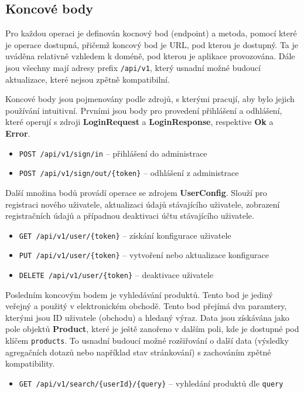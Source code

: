 \documentclass[FM,DP]{tulthesis}
\begin{document}
\subsection{Koncové body}

Pro každou operaci je definován kocnový bod (endpoint) a metoda, pomocí které je operace
dostupná, přičemž koncový bod je URL, pod kterou je dostupný. Ta je uváděna relativně
vzhledem k doméně, pod kterou je aplikace provozována. Dále jsou všechny mají adresy
prefix \verb|/api/v1|, který usnadní možné budoucí aktualizace, které nejsou zpětně kompatibilní.

Koncové body jsou pojmenovány podle zdrojů, s kterými pracují, aby bylo jejich používání 
intuitivní. Prvními jsou body pro provedení přihlášení a odhlášení, které operují
s zdroji \textbf{LoginRequest} a \textbf{LoginResponse}, respektive \textbf{Ok} a \textbf{Error}.

\begin{itemize}
\item \verb|POST /api/v1/sign/in| -- přihlášení do administrace
\item \verb|POST /api/v1/sign/out/{token}| -- odhlášení z administrace
\end{itemize}

Další množina bodů provádí operace se zdrojem \textbf{UserConfig}. Slouží pro registraci
nového uživatele, aktualizaci údajů stávajícího uživatele, zobrazení registračních údajů
a případnou deaktivaci účtu stávajícího uživatele.

\begin{itemize}
\item \verb|GET /api/v1/user/{token}| -- získání konfigurace uživatele
\item \verb|PUT /api/v1/user/{token}| -- vytvoření nebo aktualizace konfigurace
\item \verb|DELETE /api/v1/user/{token}| -- deaktivace uživatele
\end{itemize}

Posledním koncovým bodem je vyhledávání produktů. Tento bod je jediný veřejný a použitý
v elektronickém obchodě. Tento bod přejímá dva paramtery, kterými jsou ID uživatele
(obchodu) a hledaný výraz. Data jsou získávána jako pole objektů \textbf{Product}, 
které je ještě zanořeno v dalším poli, kde je dostupné pod klíčem \verb|products|.
To usnadní budoucí možné rozšiřování o další data (výsledky agregačních dotazů nebo 
například stav stránkování) s zachováním zpětné kompatibility.

\begin{itemize}
\item \verb|GET /api/v1/search/{userId}/{query}| -- vyhledání produktů dle \verb|query|
\end{itemize}
\end{document}
